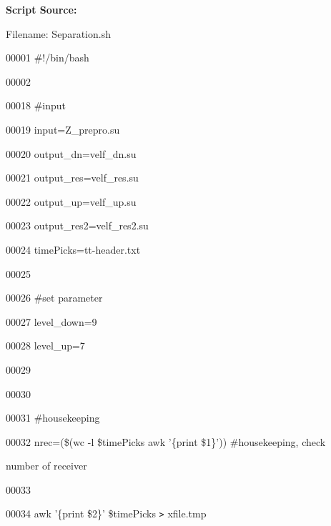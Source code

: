 \documentclass{article}
\begin{document}
\vspace{4pt}
\baselineskip=12pt
\leftskip=0pt
\textbf{Script Source:}

\vspace{4pt}
Filename: Separation.sh

\vspace{16pt}
00001 \#!/bin/bash

\vspace{4pt}
00002 

\vspace{4pt}
00018 \#input

\vspace{4pt}
00019 input=Z\_prepro.su

\vspace{4pt}
00020 output\_dn=velf\_dn.su

\vspace{4pt}
00021 output\_res=velf\_res.su

\vspace{4pt}
00022 output\_up=velf\_up.su

\vspace{4pt}
00023 output\_res2=velf\_res2.su

\vspace{4pt}
00024 timePicks=tt-header.txt

\vspace{4pt}
00025 

\vspace{4pt}
00026 \#set parameter

\vspace{4pt}
00027 level\_down=9

\vspace{4pt}
00028 level\_up=7

\vspace{4pt}
00029 

\vspace{4pt}
00030 

\vspace{4pt}
00031 \#housekeeping

\vspace{4pt}
00032 nrec=(\$(wc -l \$timePicks \textbar{} awk '\{print \$1\}')) \#housekeeping, 
check 

\vspace{4pt}
number of receiver

\vspace{4pt}
00033 

\vspace{4pt}
00034 awk '\{print \$2\}' \$timePicks \texttt{>} xfile.tmp
\end{document}
